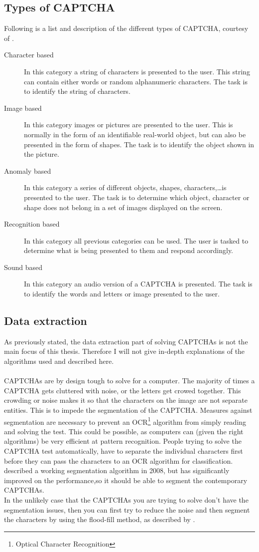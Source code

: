 \documentclass[pdftex,a4paper,12pt,twoside]{report}
\theoremstyle{plain} \newtheorem{theorem}{Theorem} \newtheorem{proposition}{Proposition} \newtheorem{lemma}{Lemma} \newtheorem*{corollary}{Corollary}
\theoremstyle{definition} \newtheorem{definition}{Definition} \newtheorem{conjecture}{Conjecture} \newtheorem*{example}{Example} \newtheorem{algorithm}{Algorithm}
\theoremstyle{remark} \newtheorem*{remark}{Remark} \newtheorem*{note}{Note} \newtheorem{case}{Case}
\begin{document}
\subsection{Types of CAPTCHA}
Following is a list and description of the different types of CAPTCHA, courtesy of \citep{Sauer2008}.
\begin{description}
\item[Character based]In this category a string of characters is presented to the user. This string can contain either words or random alphanumeric characters. The task is to identify the string of characters.
\item[Image based]In this category images or pictures are presented to the user. This is normally in the form of an identifiable real-world object, but can also be presented in the form of shapes. The task is to identify the object shown in the picture.
\item[Anomaly based]In this category a series of different objects, shapes, characters,\ldots is presented to the user. The task is to determine which object, character or shape does not belong in a set of images displayed on the screen.
\item[Recognition based]In this category all previous categories can be used. The user is tasked to determine what is being presented to them and respond accordingly.
\item[Sound based]In this category an audio version of a CAPTCHA is presented. The task is to identify the words and letters or image presented to the user.
\end{description}
\subsection{Data extraction}
As previously stated, the data extraction part of solving CAPTCHAs is not the main focus of this thesis. Therefore I will not give in-depth explanations of the algorithms used and described here.\\\\CAPTCHAs are by design tough to solve for a computer. The majority of times a CAPTCHA gets cluttered with noise, or the letters get crowed together. This crowding or noise makes it so that the characters on the image are not separate entities. This is to impede the segmentation of the CAPTCHA. Measures against segmentation are necessary to prevent an OCR\footnote{Optical Character Recognition} algorithm from simply reading and solving the test. This could be possible, as computers can (given the right algorithms) be very efficient at pattern recognition. People trying to solve the CAPTCHA test automatically, have to separate the individual characters first before they can pass the characters to an OCR algorithm for classification.\\\citep{Yan2008} described a working segmentation algorithm in 2008, but \citep{Huang2010} has significantly improved on the performance,so it should be able to segment the contemporary CAPTCHAs.\\In the unlikely case that the CAPTCHAs you are trying to solve don't have the segmentation issues, then you can first try to reduce the noise and then segment the characters by using the flood-fill method, as described by \citep{Cai2008}.
\end{document}
